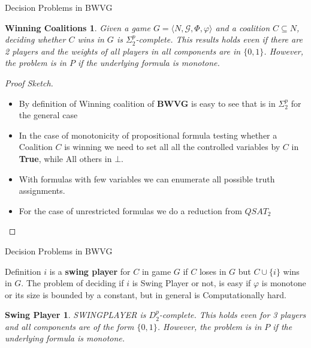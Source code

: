 \documentclass{beamer}
\begin{document}
\begin{frame}[fragile]{Decision Problems in BWVG}
  \newtheorem{theorem2}{Winning Coalitions}
  \begin{theorem2}
    Given a game $G = \langle N, \mathcal{G}, \Phi, \varphi \rangle$ and a coalition $C \subseteq N$, 
    deciding whether $C$ wins in $G$ is $\Sigma_2^p$-complete. This results holds even if there are 2 players
    and the weights of all players in all components are in $\{0,1\}$. However, the problem is in $P$ if the underlying
    formula is monotone.
  \end{theorem2}
  \begin{proof}[Proof Sketch]
    \begin{itemize}
      \item By definition of Winning coalition of \textbf{BWVG} is easy to see that is in $\Sigma_2^p$ for the general case
      \item In the case of monotonicity of propositional formula testing whether a Coalition $C$ is winning we need to set all 
      all the controlled variables by $C$ in \textbf{True}, while All others in \textbf{$\bot$}.
      \item With formulas with few variables we can enumerate all possible truth assignments.
      \item For the case of unrestricted formulas we do a reduction from $QSAT_2$
    \end{itemize}
  \end{proof}
\end{frame}

\begin{frame}[fragile]{Decision Problems in BWVG}
  \newtheorem{theorem3}{Swing Player}
  \begin{block}{Definition}
    $i$ is a \textbf{swing player} for $C$ in game $G$ if $C$ loses in $G$ but $C \cup \{i\}$ wins in $G$.\newline
    The problem of deciding if $i$ is Swing Player or not, is easy if $\varphi$ is monotone or its size is bounded by a constant, but in general is
    Computationally hard.
  \end{block}
  \begin{theorem3}
    SWINGPLAYER is $D_2^p$-complete. This holds even for 3 players and all components are of the form $\{0,1\}$. However, the problem is in $P$ if the underlying
    formula is monotone.
  \end{theorem3}
\end{frame}
\end{document}
